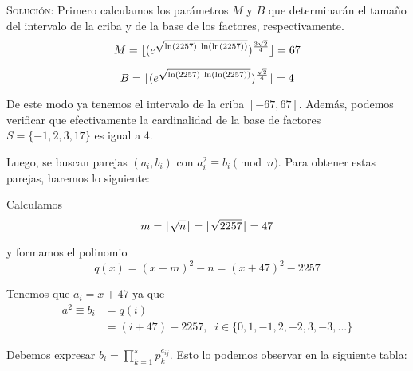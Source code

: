 \documentclass[letterpaper,11pt]{article}
\DeclarePairedDelimiter\floor{\lfloor}{\rfloor}
\begin{document}
\begin{enumerate}
\begin{enumerate}
        \textsc{Solución:} Primero calculamos los parámetros $M$ y $B$ que 
        determinarán el tamaño del intervalo de la criba y de la base de los 
        factores, respectivamente.
        \begin{equation*}
            M 
            = \floor{(e^{\sqrt{\ln(2257) \; \ln(\ln(2257))}})^
              {\frac{3 \sqrt{2}}{4}}}
            = 67
        \end{equation*}
        
        \begin{equation*}
            B 
            = \floor{(e^{\sqrt{\ln(2257) \; \ln(\ln(2257))}})^
              {\frac{\sqrt{2}}{4}}}
            = 4
        \end{equation*}
        
        De este modo ya tenemos el intervalo de la criba $[-67,67]$. Además, 
        podemos verificar que efectivamente la cardinalidad de la base de
        factores $S = \{-1, 2, 3, 17\}$ es igual a $4$.
        
        Luego, se buscan parejas $(a_{i}, b_{i})$ con $a^{2}_{i} \equiv 
        b_{i} \pmod{n}$. Para obtener estas parejas, haremos lo siguiente:
        
        Calculamos
        \begin{equation*}
            m = \floor{\sqrt{n}} = \floor{\sqrt{2257}} = 47
        \end{equation*}
        
        y formamos el polinomio
        \begin{equation*}
            q(x) = (x + m)^{2} - n = (x + 47)^{2} - 2257
        \end{equation*}
        
        Tenemos que $a_{i} = x + 47$ ya que 
        \begin{align*}
            a^{2} \equiv b_{i} 
            &= q(i) \\ 
            &= (i + 47) - 2257, \; \; i \in \{0, 1, -1, 2, -2, 3, -3, ...\}
        \end{align*}

        Debemos expresar $b_{i} = \prod^{s}_{k = 1} p^{e_{ij}}_{k}$. Esto lo
        podemos observar en la siguiente tabla:
        

\end{enumerate}
\end{enumerate}
\end{document}
